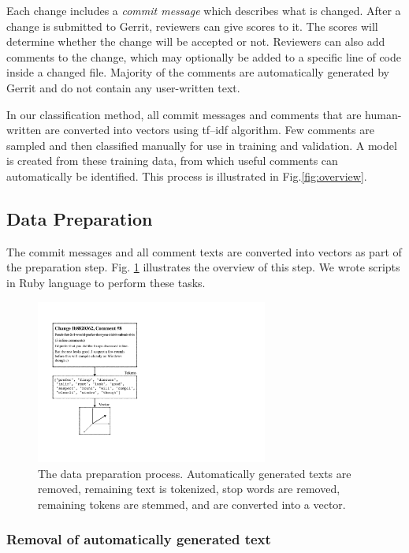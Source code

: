 \documentclass[conference]{IEEEtran}
\begin{document}
Each change includes a \emph{commit message} which describes what is changed.
After a change is submitted to Gerrit, reviewers can give scores to it.
The scores will determine whether the change will be accepted or not.
Reviewers can also add comments to the change, which may optionally be added to a specific line of code inside a changed file.
Majority of the comments are automatically generated by Gerrit and do not contain any user-written text.

In our classification method,
all commit messages and comments that are human-written are converted into vectors using tf--idf algorithm.
Few comments are sampled and then classified manually for use in training and validation.
A model is created from these training data, from which useful comments can automatically be identified.
This process is illustrated in Fig.\ref{fig:overview}.

\subsection{Data Preparation}

The commit messages and all comment texts are converted into vectors as part of the preparation step.
Fig. \ref{fig:preprocess} illustrates the overview of this step.
We wrote scripts in Ruby language to perform these tasks.

\begin{figure}[h]
\centering
\includegraphics[width=3in]{preprocess}
\caption{The data preparation process.
Automatically generated texts are removed, remaining text is tokenized, stop words are removed, remaining tokens are stemmed,
and are converted into a vector.}
\label{fig:preprocess}
\end{figure}

\subsubsection{Removal of automatically generated text}
\end{document}
